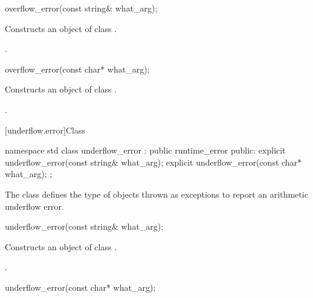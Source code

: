 %
\begin{itemdecl}
overflow_error(const string& what_arg);
\end{itemdecl}

\begin{itemdescr}
\pnum
\effects
Constructs an object of class
.

\pnum
\postconditions
{}.
\end{itemdescr}

%
\begin{itemdecl}
overflow_error(const char* what_arg);
\end{itemdecl}

\begin{itemdescr}
\pnum
\effects
Constructs an object of class
.

\pnum
\postconditions
{}.
\end{itemdescr}

[underflow.error]{Class }

%
\begin{codeblock}
namespace std {
  class underflow_error : public runtime_error {
  public:
    explicit underflow_error(const string& what_arg);
    explicit underflow_error(const char* what_arg);
  };
}
\end{codeblock}

\pnum
The class
defines the type of objects thrown as exceptions to report an arithmetic underflow error.

%
\begin{itemdecl}
underflow_error(const string& what_arg);
\end{itemdecl}

\begin{itemdescr}
\pnum
\effects
Constructs an object of class
.

\pnum
\postconditions
{}.
\end{itemdescr}

%
\begin{itemdecl}
underflow_error(const char* what_arg);
\end{itemdecl}

